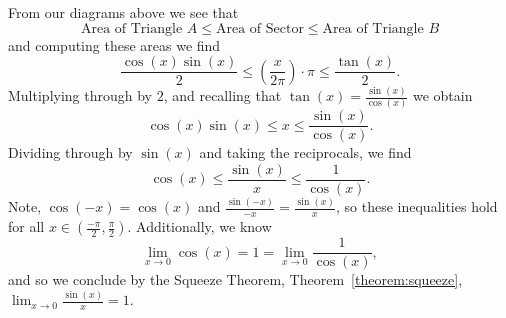 \begin{solution}
From our diagrams above we see that
\[
\text{Area of Triangle $A$} \le \text{Area of Sector} \le \text{Area of Triangle $B$}
\]
and computing these areas we find
\[
\frac{\cos(x)\sin(x)}{2} \le \left(\frac{x}{2\pi}\right)\cdot\pi \le \frac{\tan(x)}{2}.
\]
Multiplying through by $2$, and recalling that $\tan(x) =
\frac{\sin(x)}{\cos(x)}$ we obtain
\[
\cos(x)\sin(x) \le x \le \frac{\sin(x)}{\cos(x)}.
\]
Dividing through by $\sin(x)$ and taking the reciprocals, we find
\[
\cos(x) \le \frac{\sin(x)}{x} \le \frac{1}{\cos(x)}.
\]
Note, $\cos(-x) = \cos(x)$ and $\frac{\sin(-x)}{-x} =
\frac{\sin(x)}{x}$, so these inequalities hold for all $x\in
\left(\frac{-\pi}{2}, \frac{\pi}{2}\right)$.  Additionally, we know
\[
\lim_{x \to 0}\cos(x) = 1 = \lim_{x\to 0}\frac{1}{\cos(x)},
\]
and so we conclude by the Squeeze Theorem,
Theorem~\ref{theorem:squeeze}, $\lim_{x \to 0}\frac{\sin(x)}{x} = 1$.
\end{solution}


